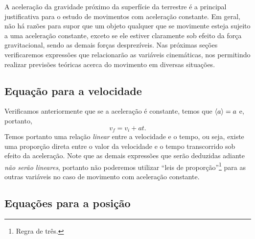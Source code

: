 A aceleração da gravidade próximo da superfície da terrestre é a principal justificativa para o estudo de movimentos com aceleração constante. Em geral, não há razões para supor que um objeto qualquer que se movimente esteja sujeito a uma aceleração constante, exceto se ele estiver claramente sob efeito da força gravitacional, sendo as demais forças desprezíveis. Nas próximas seções verificaremos expressões que relacionarão as variáveis cinemáticas, nos permitindo realizar previsões teóricas acerca do movimento em diversas situações.

\subsection{Equação para a velocidade}

Verificamos anteriormente que se a aceleração é constante, temos que $\left\langle{a}\right\rangle = a$ e, portanto,
\begin{equation*}
  v_f = v_i + at.
\end{equation*}
%
Temos portanto uma relação \emph{linear} entre a velocidade e o tempo, ou seja, existe uma proporção direta entre o valor da velocidade e o tempo transcorrido sob efeito da aceleração. Note que as demais expressões que serão deduzidas adiante \emph{não serão lineares}, portanto não poderemos utilizar ``leis de proporção''\footnote{Regra de três.} para as outras variáveis no caso de movimento com aceleração constante.

\subsection{Equações para a posição}

